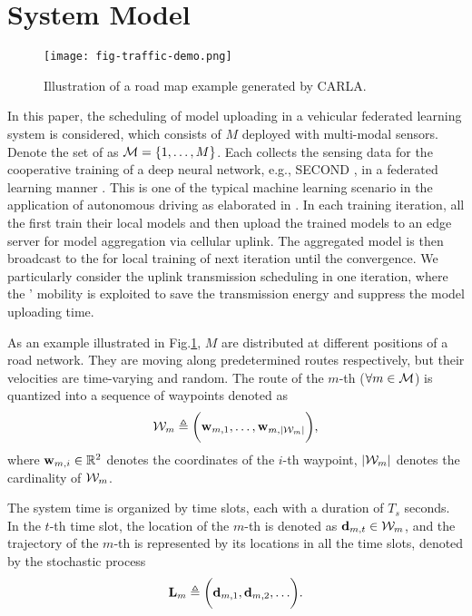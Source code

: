 \section{System Model}
\label{sec:model}

\begin{figure}[htp!]
    \centering
    \texttt{[image: fig-traffic-demo.png]}
    \caption{Illustration of a road map example generated by CARLA.}
    \label{fig:town_map}
\end{figure}

In this paper, the scheduling of model uploading in a vehicular federated learning system is considered, which consists of $M$ {\IAVs} deployed with multi-modal sensors.
Denote the set of {\IAVs} as $\mathcal{M} = \{1, \dots, M\}$.
Each {\IAV} collects the sensing data for the cooperative training of a deep neural network, e.g., SECOND \cite{SECOND}, in a federated learning manner \cite{FedAvg}.
This is one of the typical machine learning scenario in the application of autonomous driving as elaborated in \cite{icra21-invs}.
In each training iteration, all the {\IAVs} first train their local models and then upload the trained models to an edge server for model aggregation via cellular uplink.
The aggregated model is then broadcast to the {\IAVs} for local training of next iteration until the convergence.
We particularly consider the uplink transmission scheduling in one iteration, where the {\IAVs}' mobility is exploited to save the transmission energy and suppress the model uploading time.

As an example illustrated in Fig.\ref{fig:town_map}, $M$ {\IAVs} are distributed at different positions of a road network.
They are moving along predetermined routes respectively, but their velocities are time-varying and random.
The route of the $m$-th {\IAV} ($\forall m\in\mathcal{M}$) is quantized into a sequence of waypoints denoted as
\begin{align*}
    \mathcal{W}_{m} \triangleq \bigg( \mathbf{w}_{m,1}, \dots, \mathbf{w}_{m,|\mathcal{W}_{m}|} \bigg),
\end{align*}
where $\mathbf{w}_{m,i} \in \mathbb{R}^2$ denotes the coordinates of the $i$-th waypoint,
$|\mathcal{W}_m|$ denotes the cardinality of $\mathcal{W}_m$.

The system time is organized by time slots, each with a duration of $T_s$ seconds.
In the $t$-th time slot, the location of the $m$-th {\IAV} is denoted as $\mathbf{d}_{m,t} \in \mathcal{W}_{m}$, and the trajectory of the $m$-th {\IAV} is represented by its locations in all the time slots, denoted by the stochastic process
\begin{align*}
    \vec{L}_{m} \define \Paren{ \vec{d}_{m,1}, \vec{d}_{m,2}, \dots }.
\end{align*}

